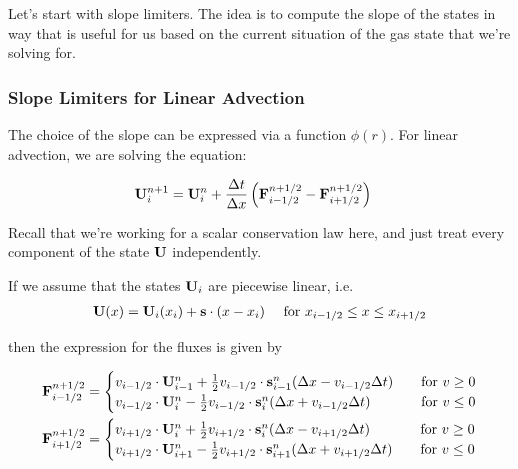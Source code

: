 Let's start with slope limiters.
The idea is to compute the slope of the states in way that is useful for us based on the current situation of the gas state that we're solving for.







\subsubsection{Slope Limiters for Linear Advection}

The choice of the slope can be expressed via a function $\phi(r)$.
For linear advection, we are solving the equation:

\begin{align}
	\mathbf{U}_i ^{n+1} &= 
		\mathbf{U}_i^{n} +  \frac{\Delta t}{\Delta x} \left( \mathbf{F}_{i-1/2}^{n+1/2} - \mathbf{F}_{i+1/2}^{n+1/2} \right) \label{eq:advection}
\end{align}


Recall that we're working for a scalar conservation law here, and just treat every component of the state $\mathbf{U}$ independently.


If we assume that the states $\mathbf{U}_i$ are piecewise linear, i.e.
\begin{align}
	\mathbf{U}(x) = \mathbf{U}_i(x_i) + \mathbf{s}\cdot (x - x_i) \quad \text{ for } x_{i-1/2} \leq x \leq x_{i+1/2} \label{eq:advection-slope}
\end{align}


then the expression for the fluxes is given by


\begin{align*}
	\mathbf{F}_{i-1/2}^{n+1/2} &= 
		\begin{cases}
			v_{i-1/2} \cdot \mathbf{U}_{i-1}^n +  \frac{1}{2} v_{i-1/2} \cdot\mathbf{s}_{i-1}^n (\Delta x -  v_{i-1/2} \Delta t)
			 	& \quad \text{for } v \geq 0 \\
			v_{i-1/2} \cdot \mathbf{U}_{i}^n -\frac{1}{2} v_{i-1/2} \cdot \mathbf{s}_{i}^n (\Delta x + v_{i-1/2} \Delta t)
				& \quad \text{for } v \leq 0 \\
		\end{cases} \\
	\mathbf{F}_{i+1/2}^{n+1/2} &= 
		\begin{cases}
			v_{i+1/2} \cdot \mathbf{U}_{i}^n +  \frac{1}{2} v_{i+1/2} \cdot\mathbf{s}_{i}^n (\Delta x -  v_{i+1/2} \Delta t)
			 	& \quad \text{for } v \geq 0 \\
			v_{i+1/2} \cdot \mathbf{U}_{i+1}^n -\frac{1}{2} v_{i+1/2} \cdot \mathbf{s}_{i+1}^n (\Delta x + v_{i+1/2} \Delta t)
				& \quad \text{for } v \leq 0 \\
		\end{cases} \\		
\end{align*}





